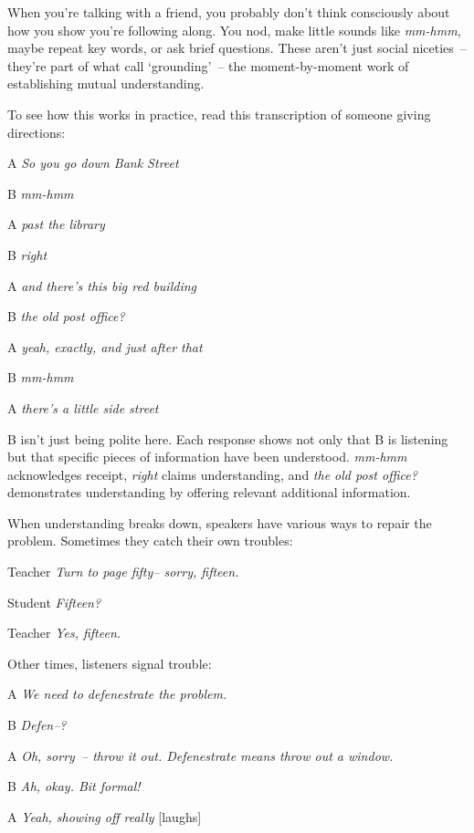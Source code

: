When you're talking with a friend, you probably don't think consciously about how you show you're following along. You nod, make little sounds like \textit{mm-hmm}, maybe repeat key words, or ask brief questions. These aren't just social niceties~-- they're part of what \citet{clark1991} call `grounding'~-- the moment-by-moment work of establishing mutual understanding.

To see how this works in practice, read this transcription of someone giving directions:

\ea
\begin{dialogue}
\item[A] \textit{So you go down Bank Street}
\item[B] \textit{mm-hmm}
\item[A] \textit{past the library}
\item[B] \textit{right}
\item[A] \textit{and there's this big red building}
\item[B] \textit{the old post office?}
\item[A] \textit{yeah, exactly, and just after that}
\item[B] \textit{mm-hmm}
\item[A] \textit{there's a little side street}
\end{dialogue}
\z
B isn't just being polite here. Each response shows not only that B is listening but that specific pieces of information have been understood. \textit{mm-hmm} acknowledges receipt, \textit{right} claims understanding, and \textit{the old post office?} demonstrates understanding by offering relevant additional information.

When understanding breaks down, speakers have various ways to repair the problem. Sometimes they catch their own troubles:

\ea
\begin{dialogue}
\item[Teacher] \textit{Turn to page fifty-- sorry, fifteen.}
\item[Student] \textit{Fifteen?}
\item[Teacher] \textit{Yes, fifteen.}
\end{dialogue}
\z
Other times, listeners signal trouble:

\ea
\begin{dialogue}
\item[A] \textit{We need to defenestrate the problem.}
\item[B] \textit{Defen--?}
\item[A] \textit{Oh, sorry~-- throw it out. Defenestrate means throw out a window.}
\item[B] \textit{Ah, okay. Bit formal!}
\item[A] \textit{Yeah, showing off really} [laughs]
\end{dialogue}
\z

